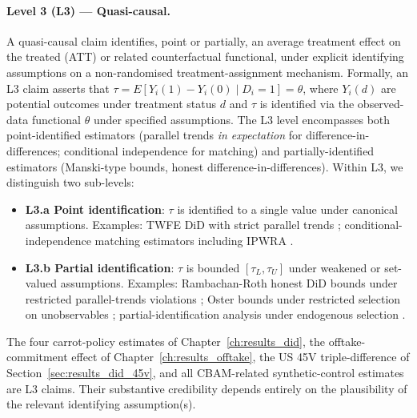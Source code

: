 \paragraph{Level 3 (L3) --- Quasi-causal.} A quasi-causal claim identifies, point or partially, an average treatment effect on the treated (ATT) or related counterfactual functional, under explicit identifying assumptions on a non-randomised treatment-assignment mechanism. Formally, an L3 claim asserts that $\tau = E[Y_i(1) - Y_i(0) \mid D_i = 1] = \theta$, where $Y_i(d)$ are potential outcomes under treatment status $d$ and $\tau$ is identified via the observed-data functional $\theta$ under specified assumptions. The L3 level encompasses both point-identified estimators (parallel trends \emph{in expectation} for difference-in-differences; conditional independence for matching) and partially-identified estimators (Manski-type bounds, honest difference-in-differences). Within L3, we distinguish two sub-levels:
\begin{itemize}[leftmargin=2em]
\item \textbf{L3.a Point identification}: $\tau$ is identified to a single value under canonical assumptions. Examples: TWFE DiD with strict parallel trends \cite{sun2021estimating, borusyak2024revisiting, callaway2021difference, dechaisemartin2024intertemporal}; conditional-independence matching estimators including IPWRA \cite{santanna2020doubly, robins2000marginal}.
\item \textbf{L3.b Partial identification}: $\tau$ is bounded $[\tau_L, \tau_U]$ under weakened or set-valued assumptions. Examples: Rambachan-Roth honest DiD bounds under restricted parallel-trends violations \cite{rambachan2023more}; Oster bounds under restricted selection on unobservables \cite{oster2019unobservable}; partial-identification analysis under endogenous selection \cite{manski2003partial}.
\end{itemize}
The four carrot-policy estimates of Chapter~\ref{ch:results_did}, the offtake-commitment effect of Chapter~\ref{ch:results_offtake}, the US 45V triple-difference of Section~\ref{sec:results_did_45v}, and all CBAM-related synthetic-control estimates are L3 claims. Their substantive credibility depends entirely on the plausibility of the relevant identifying assumption(s).

